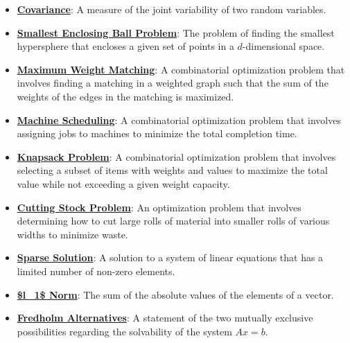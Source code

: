 \documentclass{article}%
\begin{document}
\begin{itemize}[leftmargin=*]
\item \href{https://www.math.purdue.edu/~yipn/421/2024-10-28-ApplsLinProg.pdf#page=14}{\textbf{Covariance}}: A measure of the joint variability of two random variables.%
\item \href{https://www.math.purdue.edu/~yipn/421/2024-10-28-ApplsLinProg.pdf#page=17}{\textbf{Smallest Enclosing Ball Problem}}: The problem of finding the smallest hypersphere that encloses a given set of points in a $d$-dimensional space.%
\item \href{https://www.math.purdue.edu/~yipn/421/2024-10-28-ApplsLinProg.pdf#page=19}{\textbf{Maximum Weight Matching}}: A combinatorial optimization problem that involves finding a matching in a weighted graph such that the sum of the weights of the edges in the matching is maximized.%
\item \href{https://www.math.purdue.edu/~yipn/421/2024-10-28-ApplsLinProg.pdf#page=22}{\textbf{Machine Scheduling}}: A combinatorial optimization problem that involves assigning jobs to machines to minimize the total completion time.%
\item \href{https://www.math.purdue.edu/~yipn/421/2024-10-28-ApplsLinProg.pdf#page=24}{\textbf{Knapsack Problem}}: A combinatorial optimization problem that involves selecting a subset of items with weights and values to maximize the total value while not exceeding a given weight capacity.%
\item \href{https://www.math.purdue.edu/~yipn/421/2024-10-28-ApplsLinProg.pdf#page=25}{\textbf{Cutting Stock Problem}}: An optimization problem that involves determining how to cut large rolls of material into smaller rolls of various widths to minimize waste.%
\item \href{https://www.math.purdue.edu/~yipn/421/2024-10-28-ApplsLinProg.pdf#page=30}{\textbf{Sparse Solution}}: A solution to a system of linear equations that has a limited number of non-zero elements.%
\item \href{https://www.math.purdue.edu/~yipn/421/2024-10-28-ApplsLinProg.pdf#page=34}{\textbf{\$l\_1\$ Norm}}: The sum of the absolute values of the elements of a vector.%
\end{itemize}%
\begin{itemize}[leftmargin=*]%
\item \href{https://www.math.purdue.edu/~yipn/421/2024-10-28-Farkas.pdf#page=3}{\textbf{Fredholm Alternatives}}: A statement of the two mutually exclusive possibilities regarding the solvability of the system $Ax = b$.%
\end{itemize}%
\end{document}
